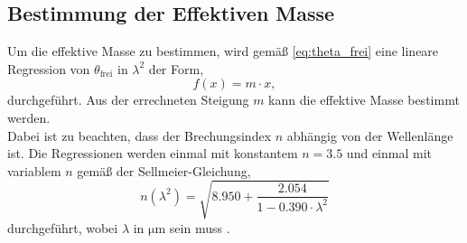 \subsection{Bestimmung der Effektiven Masse}
Um die effektive Masse zu bestimmen, wird gemäß \autoref{eq:theta_frei} eine lineare Regression von $\theta_\text{frei}$ in $\lambda^2$ der Form,
\begin{equation}
f(x)=m \cdot x,
\label{eq:lineareform}
\end{equation}
durchgeführt. Aus der errechneten Steigung $m$ kann die effektive Masse bestimmt werden.\\
Dabei ist zu beachten, dass der Brechungsindex $n$ abhängig von der Wellenlänge ist. Die Regressionen werden einmal mit konstantem $n = \num{3,5}$
und einmal mit variablem $n$ gemäß der Sellmeier-Gleichung,
\begin{equation}
    n(\lambda^2) = \sqrt{\num{8,950} + \frac{\num{2,054}}{1 - \num{0,390} \cdot \lambda^2}}
    \label{eq:sellmeier}
\end{equation}
durchgeführt, wobei $\lambda$ in $\si{\micro\meter}$ sein muss \cite{sellmeier}.

